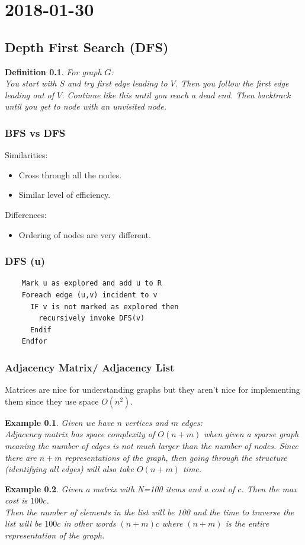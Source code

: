 \documentclass{report}
\newtheorem*{ex}{Example}
\newtheorem*{defn}{Definition}
\newcommand{\mychapter}[2]{
	\setcounter{chapter}{#1}
	\setcounter{section}{0}
	\chapter*{#2}
	\addcontentsline{toc}{chapter}{#2}
}
\begin{document}
 
\tableofcontents{}
\mychapter{1}{2018-01-30}
\section{Depth First Search (DFS)}
\begin{defn}
For graph $G$:\\
You start with $S$ and try first edge leading to $V$. Then you follow the first edge leading out of $V$. Continue like this until you reach a dead end. Then backtrack until you get to node with an unvisited node.
\end{defn}
\subsection{BFS vs DFS}
Similarities:
	\begin{itemize}
	\item Cross through all the nodes.
	\item Similar level of efficiency.
	\end{itemize}
Differences:
	\begin{itemize}
	\item Ordering of nodes are very different.
	\end{itemize}

\subsection{DFS (u)}
	\begin{verbatim}
	Mark u as explored and add u to R
	Foreach edge (u,v) incident to v
	  IF v is not marked as explored then
	    recursively invoke DFS(v)
	  Endif
	Endfor
	\end{verbatim}

\subsection{Adjacency Matrix/ Adjacency List}
Matrices are nice for understanding graphs but they aren't nice for implementing them since they use space $O(n^2)$.\\
\begin{ex}
Given we have $n$ vertices and $m$ edges:\\
Adjacency matrix has space complexity of $O(n+m)$ when given a sparse graph meaning the number of edges is not much larger than the number of nodes. Since there are $n+m$ representations of the graph, then going through the structure (identifying all edges) will also take $O(n+m)$ time.
\end{ex}
\begin{ex}
Given a matrix with N=100 items and a cost of $c$. Then the max cost is $100c$.\\
Then the number of elements in the list will be 100 and the time to traverse the list will be $100c$ in other words $(n+m)c$ where $(n+m)$ is the entire representation of the graph.
\end{ex}
\end{document}
